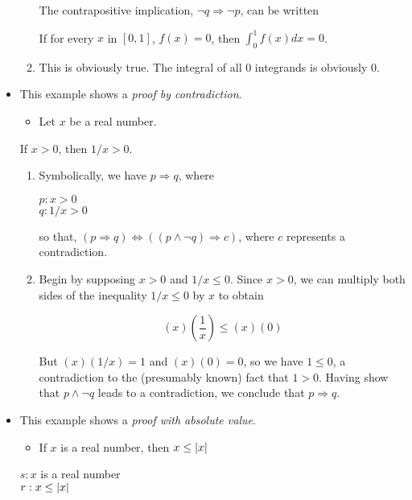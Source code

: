 \documentclass[12pt]{article}
\begin{document}
\begin{itemize}
\begin{enumerate}
The contrapositive implication, \(\neg{}q\Rightarrow{}\neg{}p\), can be written
\begin{center}
If for every \(x\) in \([0,1]\), \(f(x)=0\), then \(\int_{0}^{1}f(x)dx=0\).
\end{center}
\item This is obviously true. The integral of all 0 integrands is obviously 0.
\end{enumerate}
\item This example shows a \emph{proof by contradiction}.
\begin{itemize}
\item Let \(x\) be a real number.
\end{itemize}
\begin{center}
If \(x>0\), then \(1/x>0\).
\end{center}

\begin{enumerate}
\item Symbolically, we have \(p\Rightarrow{}q\), where
\begin{center}
\(p: x>0\) \\
\(q: 1/x>0\) \\
\end{center}

so that, \((p\Rightarrow{}q)\Leftrightarrow{}((p\land{}\neg{}q)\Rightarrow{}c)\), where \(c\) represents a contradiction.
\item Begin by supposing \(x>0\) and \(1/x\le0\). Since \(x>0\), we can multiply both
sides of the inequality \(1/x\le{}0\) by \(x\) to obtain
\begin{center}
$$(x)\left(\frac{1}{x}\right)\le(x)(0)$$
\end{center}

But \((x)(1/x)=1\) and \((x)(0)=0\), so we have \(1\le0\), a contradiction to the
(presumably known) fact that \(1>0\). Having show that \(p\land{}\neg{}q\) leads to a
contradiction, we conclude that \(p\Rightarrow{}q\).
\end{enumerate}
\item This example shows a \emph{proof with absolute value}.
\begin{itemize}
\item If \(x\) is a real number, then \(x\le\left|x\right|\)
\end{itemize}
\begin{center}
\(s: x\) is a real number \\
\(r: x\le\left|x\right|\) \\
\end{center}


\end{itemize}
\end{document}

